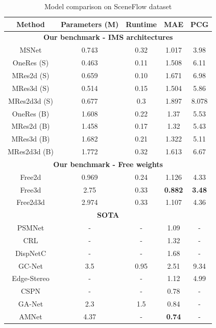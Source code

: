 \documentclass[runningheads]{llncs}
\begin{document}
\begin{table}[t]
    \centering
    \begin{tabular}{ c|c|c|c|c }
    Method & Parameters (M) & Runtime & MAE & PCG \\
    
    \hline
    \multicolumn{5}{c}{ \textbf{Our benchmark - IMS architectures} } \\
    \hline
    MSNet & 0.743 & 0.32 & 1.017 & 3.98 \\
    \hline
    OneRes (S) & 0.463 & 0.11 & 1.508 & 6.11 \\
    MRes2d (S) & 0.659 & 0.10 & 1.671 & 6.98 \\
    MRes3d (S) & 0.514 & 0.15 & 1.504 & 5.86 \\
    MRes2d3d (S) & 0.677 & 0.3 & 1.897 & 8.078 \\
    \hline
    OneRes (B) & 1.608 & 0.22 & 1.37 & 5.53 \\
    MRes2d (B) & 1.458 & 0.17 & 1.32 & 5.43 \\
    MRes3d (B) & 1.682 & 0.21 & 1.322 & 5.11 \\
    MRes2d3d (B) & 1.772 & 0.32 & 1.613 & 6.67 \\
    \hline
    \multicolumn{5}{c}{ \textbf{Our benchmark - Free weights} } \\
    \hline
    Free2d & 0.969 & 0.24 & 1.126 & 4.33 \\
    Free3d & 2.75 & 0.33 & \textbf{0.882} & \textbf{3.48} \\
    Free2d3d & 2.974 & 0.33 & 1.107 & 4.36 \\
    \hline
    \multicolumn{5}{c}{ \textbf{SOTA} } \\
    \hline
    PSMNet\cite{Chang2018PyramidNetwork} & - & - & 1.09 & - \\
    CRL\cite{Pang2018CascadeMatching} & - & - & 1.32 & - \\
    DispNetC\cite{Mayer2016ALD} & - & - & 1.68 & - \\
    GC-Net\cite{Kendall2017End-to-EndRegression} & 3.5 & 0.95 & 2.51 & 9.34 \\
    Edge-Stereo\cite{SongEdgeStereoResidual} & - & - & 1.12 & 4.99 \\
    CSPN\cite{cheng2018learning} & - & - & 0.78 & - \\
    GA-Net\cite{zhang2019ga} & 2.3 & 1.5 & 0.84 & - \\
    AMNet\cite{du2019amnet} & 4.37 & - & \textbf{0.74} & - \\
    
    \hline
    \end{tabular}
    \caption{Model comparison on SceneFlow dataset}
    \label{tab:results}
\end{table}
\end{document}
